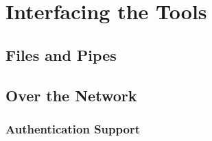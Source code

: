 \section{Interfacing the Tools}
\subsection{Files and Pipes}
\subsection{Over the Network}
\subsubsection{Authentication Support}
